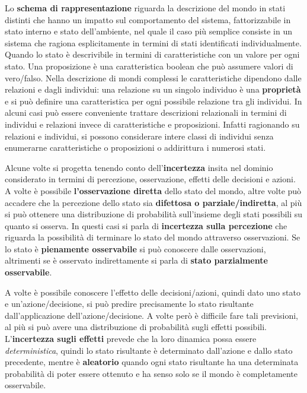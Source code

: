\documentclass[a4paper]{extarticle}
\begin{document}
Lo \textbf{schema di rappresentazione} riguarda la descrizione del mondo in stati distinti che hanno un impatto sul comportamento del sistema, fattorizzabile in stato interno e stato dell'ambiente, nel quale il caso più semplice consiste in un sistema che ragiona esplicitamente in termini di stati identificati individualmente. Quando lo stato è descrivibile in termini di caratteristiche con un valore per ogni stato. Una proposizione è una caratteristica boolean che può assumere valori di vero/falso. Nella descrizione di mondi complessi le caratteristiche dipendono dalle relazioni e dagli individui: una relazione su un singolo individuo è una \textbf{proprietà} e si può definire una caratteristica per ogni possibile relazione tra gli individui. In alcuni casi può essere conveniente trattare descrizioni relazionali in termini di individui e relazioni invece di caratteristiche e proposizioni. Infatti ragionando su relazioni e individui, si possono considerare intere classi di individui senza enumerarne caratteristiche o proposizioni o addirittura i numerosi stati.

Alcune volte si progetta tenendo conto dell'\textbf{incertezza} insita nel dominio considerato in termini di percezione, osservazione, effetti delle decisioni e azioni. A volte è possibile \textbf{l'osservazione diretta} dello stato del mondo, altre volte può accadere che la percezione dello stato sia \textbf{difettosa o parziale/indiretta}, al più si può ottenere una distribuzione di probabilità sull'insieme degli stati possibili su quanto si osserva. In questi casi si parla di \textbf{incertezza sulla percezione} che riguarda la possibilità di terminare lo stato del mondo attraverso osservazioni. Se lo stato è \textbf{pienamente osservabile} si può conoscere dalle osservazioni, altrimenti se è osservato indirettamente si parla di \textbf{stato parzialmente osservabile}.

A volte è possibile conoscere l'effetto delle decisioni/azioni, quindi dato uno stato e un'azione/decisione, si può predire precisamente lo stato risultante dall'applicazione dell'azione/decisione. A volte però è difficile fare tali previsioni, al più si può avere una distribuzione di probabilità sugli effetti possibili. L'\textbf{incertezza sugli effetti} prevede che la loro dinamica possa essere \textit{deterministica}, quindi lo stato risultante è determinato dall'azione e dallo stato precedente, mentre è \textbf{aleatorio} quando ogni stato risultante ha una determinata probabilità di poter essere ottenuto e ha senso solo se il mondo è completamente osservabile.
\end{document}
